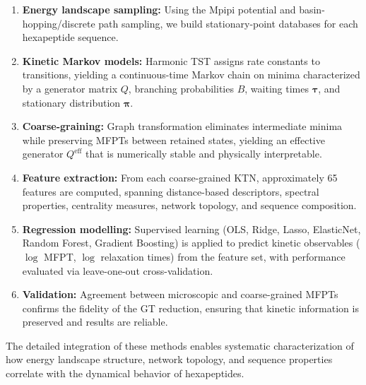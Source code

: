\begin{enumerate}
  \item \textbf{Energy landscape sampling:} Using the Mpipi potential and
        basin-hopping/discrete path sampling, we build stationary-point databases for
        each hexapeptide sequence.

  \item \textbf{Kinetic Markov models:} Harmonic TST assigns rate constants to
        transitions, yielding a continuous-time Markov chain on minima characterized by
        a generator matrix $Q$, branching probabilities $B$, waiting times
        $\boldsymbol{\tau}$, and stationary distribution $\boldsymbol{\pi}$.

  \item \textbf{Coarse-graining:} Graph transformation eliminates intermediate minima
        while preserving MFPTs between retained states, yielding an effective generator
        $Q^{\mathrm{eff}}$ that is numerically stable and physically interpretable.

  \item \textbf{Feature extraction:} From each coarse-grained KTN, approximately 65
        features are computed, spanning distance-based descriptors, spectral properties,
        centrality measures, network topology, and sequence composition.

  \item \textbf{Regression modelling:} Supervised learning (OLS, Ridge, Lasso,
        ElasticNet, Random Forest, Gradient Boosting) is applied to predict kinetic
        observables ($\log$ MFPT, $\log$ relaxation times) from the feature set, with
        performance evaluated via leave-one-out cross-validation.

  \item \textbf{Validation:} Agreement between microscopic and coarse-grained MFPTs
        confirms the fidelity of the GT reduction, ensuring that kinetic information is
        preserved and results are reliable.
\end{enumerate}

The detailed integration of these methods enables systematic characterization of how
energy landscape structure, network topology, and sequence properties correlate with the
dynamical behavior of hexapeptides.
